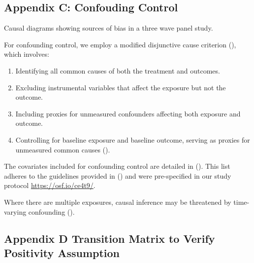 \documentclass[
  single column]{article}
\providecommand{\tightlist}{%
  \setlength{\itemsep}{0pt}\setlength{\parskip}{0pt}}\usepackage{longtable,booktabs,array}
\begin{document}
\endgroup{}
\endgroup{}

\subsection{Appendix C: Confouding
Control}\label{appendix-c-confouding-control}

\begin{table}

\caption{\label{tbl-02}Causal diagrams showing sources of bias in a
three wave panel study.}

\centering{

\threewavepaneltwo

}

\end{table}%

For confounding control, we employ a modified disjunctive cause
criterion (), which
involves:

\begin{enumerate}
\def\labelenumi{\arabic{enumi}.}
\tightlist
\item
  Identifying all common causes of both the treatment and outcomes.
\item
  Excluding instrumental variables that affect the exposure but not the
  outcome.
\item
  Including proxies for unmeasured confounders affecting both exposure
  and outcome.
\item
  Controlling for baseline exposure and baseline outcome, serving as
  proxies for unmeasured common causes
  ().
\end{enumerate}

The covariates included for confounding control are detailed in
(). This list
adheres to the guidelines provided in
() and were
pre-specified in our study protocol \url{https://osf.io/ce4t9/}.

Where there are multiple exposures, causal inference may be threatened
by time-varying confounding
().

\newpage{}

\subsection{Appendix D Transition Matrix to Verify Positivity
Assumption}\label{appendix-transition}
\end{document}
